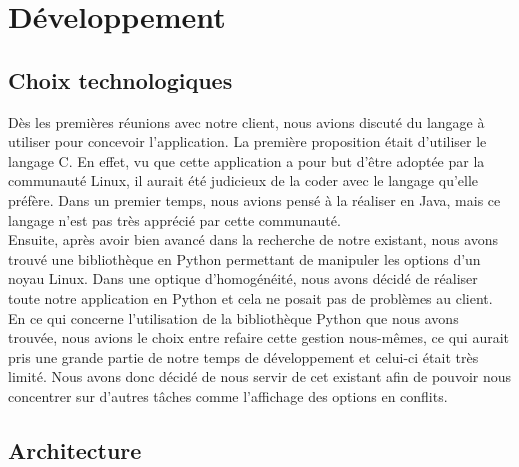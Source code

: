\documentclass[16pts]{report}
\begin{document}
\chapter{Développement}
\label{cha:Développement}
    \section{Choix technologiques}
    \label{sub:Choix technologiques}

Dès les premières réunions avec notre client, nous avions discuté du langage à 
utiliser pour concevoir l'application. La première proposition était d'utiliser 
le langage C. En effet, vu que cette application a pour but d'être adoptée par 
la communauté Linux, il aurait été judicieux de la coder avec le langage 
qu'elle préfère. Dans un premier temps, nous avions pensé à la réaliser
en Java, mais ce langage n'est pas très apprécié par cette communauté.
\\

Ensuite, après avoir bien avancé dans la recherche de notre existant, nous 
avons trouvé une bibliothèque en Python permettant de manipuler les options 
d'un noyau Linux. Dans une optique d'homogénéité, nous avons décidé de réaliser 
toute notre application en Python et cela ne posait pas de problèmes au client.
\\

En ce qui concerne l'utilisation de la bibliothèque Python que nous avons 
trouvée, nous avions le choix entre refaire cette gestion nous-mêmes, ce qui 
aurait pris une grande partie de notre temps de développement et celui-ci 
était très limité. Nous avons donc décidé de nous servir de cet existant 
afin de pouvoir nous concentrer sur d'autres tâches comme l'affichage 
des options en conflits.


    \section{Architecture}
    \label{sub:Architecture}
\end{document}
